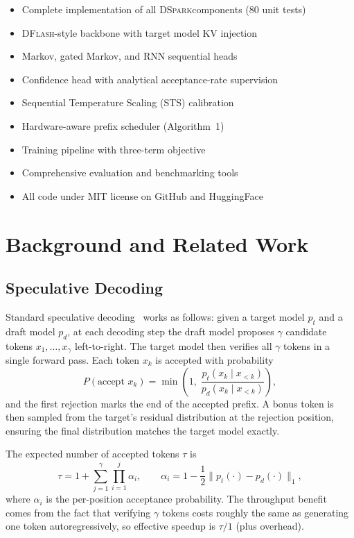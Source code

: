 \documentclass[11pt,a4paper]{article}
\newcommand{\DSpark}{\textsc{DSpark}}
\newcommand{\DFlash}{\textsc{DFlash}}
\begin{document}
\begin{itemize}
  \item Complete implementation of all \DSpark components (80 unit tests)
  \item \DFlash-style backbone with target model KV injection
  \item Markov, gated Markov, and RNN sequential heads
  \item Confidence head with analytical acceptance-rate supervision
  \item Sequential Temperature Scaling (STS) calibration
  \item Hardware-aware prefix scheduler (Algorithm~1)
  \item Training pipeline with three-term objective
  \item Comprehensive evaluation and benchmarking tools
  \item All code under MIT license on GitHub and HuggingFace
\end{itemize}

\section{Background and Related Work}
\label{sec:background}

\subsection{Speculative Decoding}
Standard speculative decoding~\cite{leviathan2023fast,
chen2023accelerating} works as follows: given a target model $p_t$ and a
draft model $p_d$, at each decoding step the draft model proposes $\gamma$
candidate tokens $x_1, \ldots, x_\gamma$ left-to-right. The target model
then verifies all $\gamma$ tokens in a single forward pass. Each token $x_k$
is accepted with probability
\begin{equation}
  \textstyle
  P(\text{accept } x_k) = \min\left(1,\; \frac{p_t(x_k \mid x_{<k})}{p_d(x_k \mid x_{<k})}\right),
  \label{eq:acceptance}
\end{equation}
and the first rejection marks the end of the accepted prefix. A bonus token
is then sampled from the target's residual distribution at the rejection
position, ensuring the final distribution matches the target model exactly.

The expected number of accepted tokens $\tau$ is
\begin{equation}
  \tau = 1 + \sum_{j=1}^\gamma \prod_{i=1}^j \alpha_i,
  \qquad
  \alpha_i = 1 - \frac12 \|p_t(\cdot) - p_d(\cdot)\|_1,
  \label{eq:expected_tau}
\end{equation}
where $\alpha_i$ is the per-position acceptance probability. The throughput
benefit comes from the fact that verifying $\gamma$ tokens costs roughly the
same as generating one token autoregressively, so effective speedup is
$\tau / 1$ (plus overhead).
\end{document}
